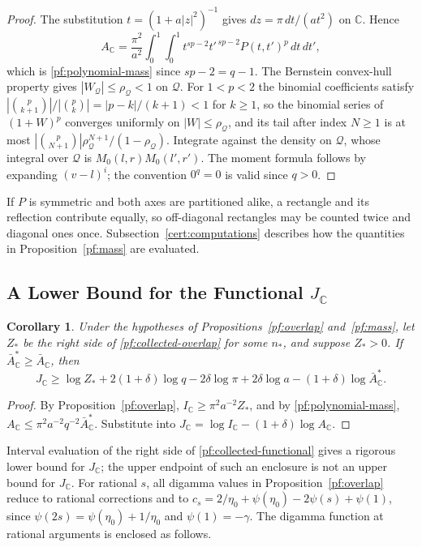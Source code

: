 \documentclass[11pt]{amsart}
\numberwithin{equation}{section}
\newtheorem{corollary}[equation]{Corollary}
\theoremstyle{definition}
\theoremstyle{remark}
\newcommand{\C}{\mathbb C}
\begin{document}
\begin{proof}
The substitution $t=(1+a|z|^2)^{-1}$ gives $dz=\pi\,dt/(at^2)$ on $\C$.
Hence
\[
 A_\C=\frac{\pi^2}{a^2}\int_0^1\!\!\int_0^1t^{sp-2}t'^{\,sp-2}
 P(t,t')^p\,dt\,dt',
\]
which is \eqref{pf:polynomial-mass} since $sp-2=q-1$. The Bernstein
convex-hull property gives $|W_{\mathcal Q}|\le\rho_{\mathcal Q}<1$ on
$\mathcal Q$. For $1<p<2$ the binomial coefficients satisfy
$|\binom p{k+1}|/|\binom pk|=|p-k|/(k+1)<1$ for $k\ge1$, so the binomial
series of $(1+W)^p$ converges uniformly on $|W|\le\rho_{\mathcal Q}$,
and its tail after index $N\ge1$ is at most
$|\binom p{N+1}|\rho_{\mathcal Q}^{N+1}/(1-\rho_{\mathcal Q})$.
Integrate against the density on $\mathcal Q$, whose integral over
$\mathcal Q$ is $M_0(l,r)M_0(l',r')$. The moment formula follows by expanding
$(v-l)^i$; the convention $0^q=0$ is valid since $q>0$.
\end{proof}

If $P$ is symmetric and both axes are partitioned alike, a rectangle and
its reflection contribute equally, so off-diagonal rectangles may be
counted twice and diagonal ones once. Subsection~\ref{cert:computations}
describes how the quantities in Proposition~\ref{pf:mass} are evaluated.

\subsection{\texorpdfstring{A Lower Bound for the Functional $J_\C$}{A Lower Bound for the Functional}}

\begin{corollary}\label{pf:functional}
Under the hypotheses of Propositions~\ref{pf:overlap} and~\ref{pf:mass},
let $Z_*$ be the right side of \eqref{pf:collected-overlap} for some
$n_*$, and suppose $Z_*>0$. If $\bar A_\C^*\ge\bar A_\C$, then
\begin{equation}\label{pf:collected-functional}
 J_\C\ge\log Z_*+2(1+\delta)\log q-2\delta\log\pi
 +2\delta\log a-(1+\delta)\log\bar A_\C^* .
\end{equation}
\end{corollary}

\begin{proof}
By Proposition~\ref{pf:overlap}, $I_\C\ge\pi^2a^{-2}Z_*$, and by
\eqref{pf:polynomial-mass}, $A_\C\le\pi^2a^{-2}q^{-2}\bar A_\C^*$.
Substitute into $J_\C=\log I_\C-(1+\delta)\log A_\C$.
\end{proof}

Interval evaluation of the right side of \eqref{pf:collected-functional}
gives a rigorous lower bound for $J_\C$; the upper endpoint of such an
enclosure is not an upper bound for $J_\C$. For rational $s$, all
digamma values in Proposition~\ref{pf:overlap} reduce to rational
corrections and to $c_s=2/\eta_0+\psi(\eta_0)-2\psi(s)+\psi(1)$, since
$\psi(2s)=\psi(\eta_0)+1/\eta_0$ and $\psi(1)=-\gamma$. The digamma
function at rational arguments is enclosed as follows.
\end{document}
